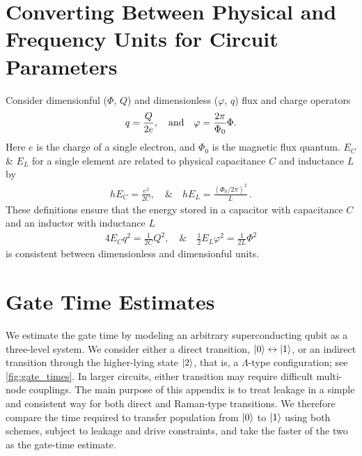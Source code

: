 \section{Converting Between Physical and Frequency Units for Circuit Parameters}\label{app:params}
Consider dimensionful ($\Phi$, $Q$) and dimensionless ($\varphi$, $q$) flux and charge operators
\begin{align}
    q = \frac{Q}{2e}, \quad {\rm and} \quad 
    \varphi = \frac{2\pi}{\Phi_0}\Phi.
\end{align}
Here $e$ is the charge of a single electron, and $\Phi_0$ is the magnetic flux quantum. $E_C$ \& $E_L$ for a single element are related to physical capacitance $C$ and inductance $L$ by
\begin{align}
 h E_C = \frac{e^2}{2C}, \quad \& \quad
 h E_L = \frac{(\Phi_0/2\pi)^2}{L}\,.
\end{align}
These definitions ensure that the energy stored in a capacitor with capacitance $C$ and an inductor with inductance $L$
\begin{align}
 4 E_C q^2 = \frac{1}{2C}Q^2, \quad \& \quad 
 \frac{1}{2} E_L \varphi^2 = \frac{1}{2 L} \Phi^2   
\end{align}
is consistent between dimensionless and dimensionful units.





\section{Gate Time Estimates}\label{app:gate_time}

We estimate the gate time by modeling an arbitrary superconducting qubit as a three-level system. We consider either a direct transition, $\ket{0} \leftrightarrow \ket{1}$, or an indirect transition through the higher-lying state $\ket{2}$, that is, a $\Lambda$-type configuration; see \cref{fig:gate_times}. In larger circuits, either transition may require difficult multi-node couplings. The main purpose of this appendix is to treat leakage in a simple and consistent way for both direct and Raman-type transitions. We therefore compare the time required to transfer population from $\ket{0}$ to $\ket{1}$ using both schemes, subject to leakage and drive constraints, and take the faster of the two as the gate-time estimate.


